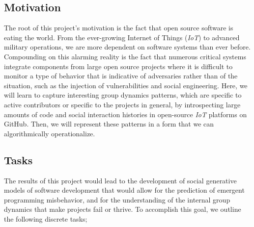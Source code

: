 \subsection{Motivation}
\label{subsec:motivation}

The root of this project's motivation is the fact that open source software is
eating the world. From the ever-growing Internet of Things (\textit{IoT}) to
advanced military operations, we are more dependent on software systems than
ever before.  Compounding on this alarming reality is the fact that numerous
critical systems integrate components from large open source projects where it
is difficult to monitor a type of behavior that is indicative of adversaries
rather than of the situation, such as the injection of vulnerabilities and
social engineering. Here, we will learn to capture interesting group dynamics
patterns, which are specific to active contributors or specific to the projects
in general, by introspecting large amounts of code and social interaction
histories in open-source \textit{IoT} platforms on GitHub. Then, we will
represent these patterns in a form that we can algorithmically operationalize.

\subsection{Tasks}
\label{subsec:tasks}

The results of this project would lead to the development of social generative
models of software development that would allow for the prediction of emergent
programming misbehavior, and for the understanding of the internal group
dynamics that make projects fail or thrive. To accomplish this goal, we outline
the following discrete tasks;

